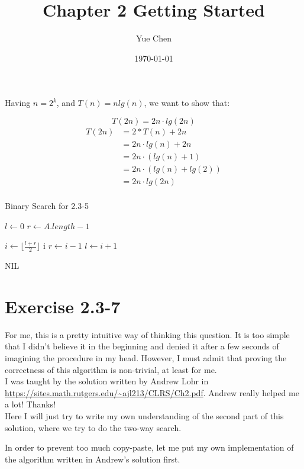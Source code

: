 \documentclass[14pt]{article}
\title{Chapter 2 Getting Started}
\author{Yue Chen}
\date{\today}
\begin{document}
\maketitle
Having $n = 2^k$, and $T(n) = n lg(n)$, we want to show that:

$$
T(2n) = 2n \cdot lg(2n)
$$
\begin{align*}
	T(2n) &= 2 * T(n) + 2n\\
	&= 2n \cdot lg(n) + 2n\\
	&= 2n \cdot (lg(n) + 1)\\
	&= 2n \cdot (lg(n) + lg(2))\\
	&= 2n \cdot lg(2n)\\
\end{align*}

\begin{algorithm}
\caption{Binary Search for 2.3-5}
\begin{algorithmic}[1]
\State $l \gets 0$
\State $r \gets A.length - 1$


	\State $i \gets \lfloor \frac{l + r}{2} \rfloor$
		\State \Return i
		\State $r \gets i - 1$
	\Else
		\State $l \gets i + 1$
	\EndIf
\EndWhile

\State \Return NIL

\end{algorithmic}
\end{algorithm}


\pagebreak

\section*{Exercise 2.3-7}
For me, this is a pretty intuitive way of thinking this question. It is too simple that I didn't believe it in the beginning and denied it after a few seconds of imagining the procedure in my head. However, I must admit that proving the correctness of this algorithm is non-trivial, at least for me.\\

I was taught by the solution written by Andrew Lohr in \url{https://sites.math.rutgers.edu/~ajl213/CLRS/Ch2.pdf}. Andrew really helped me a lot! Thanks!\\

Here I will just try to write my own understanding of the second part of this solution, where we try to do the two-way search.

In order to prevent too much copy-paste, let me put my own implementation of the algorithm written in Andrew's solution first.
\end{document}
